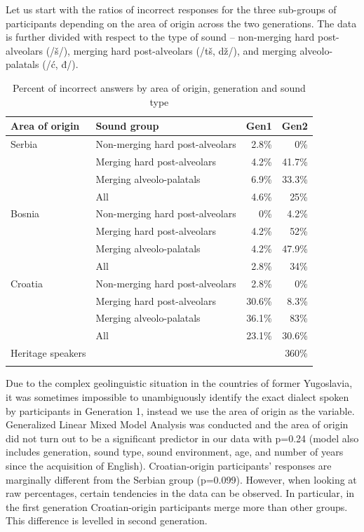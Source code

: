 \documentclass[output=paper,modfonts,nonflat,
]{langsci/langscibook}
\begin{document}
Let us start with the ratios of incorrect responses for the three sub-groups of participants depending on the area of origin across the two generations. The data is further divided with respect to the type of sound – non-merging hard post-alveolars (/š/), merging hard post-alveolars (/tš, dž/), and merging alveolo-palatals (/ć, đ/).


\begin{table}
\begin{tabularx}{\textwidth}{lQrr}
\lsptoprule

{ Area of origin} &  Sound group &  Gen1 &  Gen2\\
\midrule
{ Serbia} & Non-merging hard post-alveolars & 2.8\% & 0\%\\
& Merging hard post-alveolars & 4.2\% & 41.7\%\\
 & Merging alveolo-palatals & 6.9\% & 33.3\%\\
 \midrule
 & All & 4.6\% & 25\%\\

\tablevspace 
 \midrule
{ Bosnia} & Non-merging hard post-alveolars & 0\% & 4.2\%\\
& Merging hard post-alveolars & 4.2\% & 52\%\\
 & Merging alveolo-palatals & 4.2\% & 47.9\%\\
\midrule
 & All & 2.8\% & 34\%\\

\tablevspace
 \midrule
{ Croatia} & Non-merging hard post-alveolars & 2.8\% & 0\%\\
& Merging hard post-alveolars & 30.6\% & 8.3\%\\
 & Merging alveolo-palatals & 36.1\% & 83\%\\
\midrule
 & All & 23.1\% & 30.6\%\\ 
 \tablevspace
 \midrule
{ Heritage speakers} &  &  & 360\%\\
\lspbottomrule
\end{tabularx}
\caption{\label{tab:mihajlovic:5} Percent of incorrect answers by area of origin, generation and sound type}
\end{table}


Due to the complex geolinguistic situation in the countries of former Yugoslavia, it was sometimes impossible to unambiguously identify the exact dialect spoken by participants in Generation 1, instead we use the area of origin as the variable. Generalized Linear Mixed Model Analysis was conducted and the area of origin did not turn out to be a significant predictor in our data with p=0.24 (model also includes generation, sound type, sound environment, age, and number of years since the acquisition of English). Croatian-origin participants’ responses are marginally different from the Serbian group (p=0.099). However, when looking at raw percentages, certain tendencies in the data can be observed. In particular, in the first generation Croatian-origin participants merge more than other groups. This difference is levelled in second generation.
\end{document}
